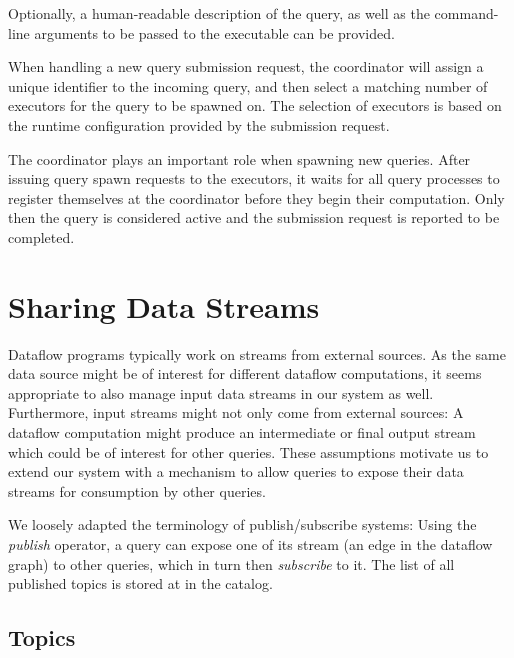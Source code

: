 Optionally, a human-readable description of the query,
as well as the command-line arguments to be passed to the executable can be
provided.

When handling a new query submission request, the coordinator will assign a
unique identifier to the incoming query, and then select a
matching number of executors for the query to be spawned on. The selection
of executors is based on the runtime configuration provided by the submission
request.

The coordinator plays an important role when spawning new queries. After
issuing query spawn requests to the executors, it waits for all query processes
to register themselves at the coordinator before they begin their computation.
Only then the query is considered active and the submission request
is reported to be completed.


\section{Sharing Data Streams}

Dataflow programs typically work on streams from external sources. As the same
data source might be of interest for different dataflow computations, it seems
appropriate to also manage input data streams in our system as well. Furthermore,
input streams might not only come from external sources: A dataflow computation
might produce an intermediate or final output stream which could be of interest
for other queries. These assumptions motivate us to extend our system with a
mechanism to allow queries to expose their data streams for consumption by other
queries.


We loosely adapted the terminology of publish/subscribe systems: Using the
\emph{publish} operator, a query can expose one of its stream
(an edge in the dataflow graph) to other queries, which in turn then \emph{subscribe}
to it. The list of all published topics is stored at in the catalog.

\subsection{Topics}

